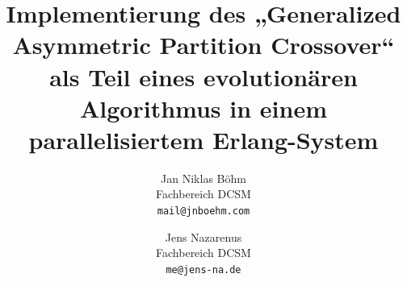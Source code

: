 
\title{Implementierung des „Generalized Asymmetric Partition Crossover“
als Teil eines evolutionären Algorithmus in einem parallelisiertem
Erlang-System}

\author{Jan Niklas Böhm\\ Fachbereich DCSM\\ \texttt{mail@jnboehm.com}\\
            \and
        Jens Nazarenus\\ Fachbereich DCSM\\ \texttt{me@jens-na.de}}
